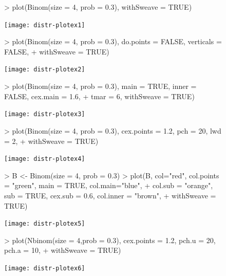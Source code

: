 \documentclass[11pt]{article}
\begin{document}
\begin{figure}[p]
\begin{Schunk}
\begin{Sinput}
> plot(Binom(size = 4, prob = 0.3), withSweave = TRUE)
\end{Sinput}
\end{Schunk}
\texttt{[image: distr-plotex1]}
\end{figure}
\begin{figure}[p]
\begin{Schunk}
\begin{Sinput}
> plot(Binom(size = 4, prob = 0.3), do.points = FALSE, verticals = FALSE,
+      withSweave = TRUE)
\end{Sinput}
\end{Schunk}
\texttt{[image: distr-plotex2]}
\end{figure}

\begin{figure}[p]
\begin{Schunk}
\begin{Sinput}
> plot(Binom(size = 4, prob = 0.3), main = TRUE, inner = FALSE, cex.main = 1.6,
+      tmar = 6, withSweave = TRUE)
\end{Sinput}
\end{Schunk}
\texttt{[image: distr-plotex3]}
\end{figure}

\begin{figure}[p]
\begin{Schunk}
\begin{Sinput}
> plot(Binom(size = 4, prob = 0.3), cex.points = 1.2, pch = 20, lwd = 2,
+      withSweave = TRUE)
\end{Sinput}
\end{Schunk}
\texttt{[image: distr-plotex4]}
\end{figure}

\begin{figure}[p]
\begin{Schunk}
\begin{Sinput}
> B <- Binom(size = 4, prob = 0.3)
> plot(B, col="red", col.points = "green", main = TRUE, col.main="blue",
+      col.sub = "orange", sub = TRUE, cex.sub = 0.6, col.inner = "brown",
+      withSweave = TRUE)
\end{Sinput}
\end{Schunk}
\texttt{[image: distr-plotex5]}
\end{figure}

\begin{figure}[p]
\begin{Schunk}
\begin{Sinput}
> plot(Nbinom(size = 4,prob = 0.3), cex.points = 1.2, pch.u = 20, pch.a = 10,
+      withSweave = TRUE)
\end{Sinput}
\end{Schunk}
\texttt{[image: distr-plotex6]}
\end{figure}
\end{document}
